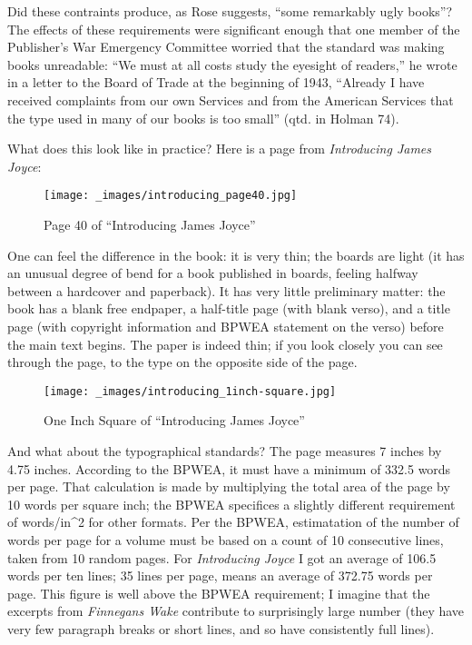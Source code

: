 \documentclass[
  12pt,
]{article}
\begin{document}
Did these contraints produce, as Rose suggests, ``some remarkably ugly
books''? The effects of these requirements were significant enough that
one member of the Publisher's War Emergency Committee worried that the
standard was making books unreadable: ``We must at all costs study the
eyesight of readers,'' he wrote in a letter to the Board of Trade at the
beginning of 1943, ``Already I have received complaints from our own
Services and from the American Services that the type used in many of
our books is too small'' (qtd. in Holman 74).

What does this look like in practice? Here is a page from
\emph{Introducing James Joyce}:

\par\begin{figure}\centering\texttt{[image: \_images/introducing\_page40.jpg]}\caption{Page 40 of “Introducing James Joyce”}\end{figure}

One can feel the difference in the book: it is very thin; the boards are
light (it has an unusual degree of bend for a book published in boards,
feeling halfway between a hardcover and paperback). It has very little
preliminary matter: the book has a blank free endpaper, a half-title
page (with blank verso), and a title page (with copyright information
and BPWEA statement on the verso) before the main text begins. The paper
is indeed thin; if you look closely you can see through the page, to the
type on the opposite side of the page.

\par\begin{figure}\centering\texttt{[image: \_images/introducing\_1inch-square.jpg]}\caption{One Inch Square of “Introducing James Joyce”}\end{figure}

And what about the typographical standards? The page measures 7 inches
by 4.75 inches. According to the BPWEA, it must have a minimum of 332.5
words per page. {That calculation is made by multiplying the total area
of the page by 10 words per square inch; the BPWEA specifices a slightly
different requirement of words/in\^{}2 for other formats.} Per the
BPWEA, estimatation of the number of words per page for a volume must be
based on a count of 10 consecutive lines, taken from 10 random pages.
For \emph{Introducing Joyce} I got an average of 106.5 words per ten
lines; 35 lines per page, means an average of 372.75 words per page.
This figure is well above the BPWEA requirement; I imagine that the
excerpts from \emph{Finnegans Wake} contribute to surprisingly large
number (they have very few paragraph breaks or short lines, and so have
consistently full lines).
\end{document}
